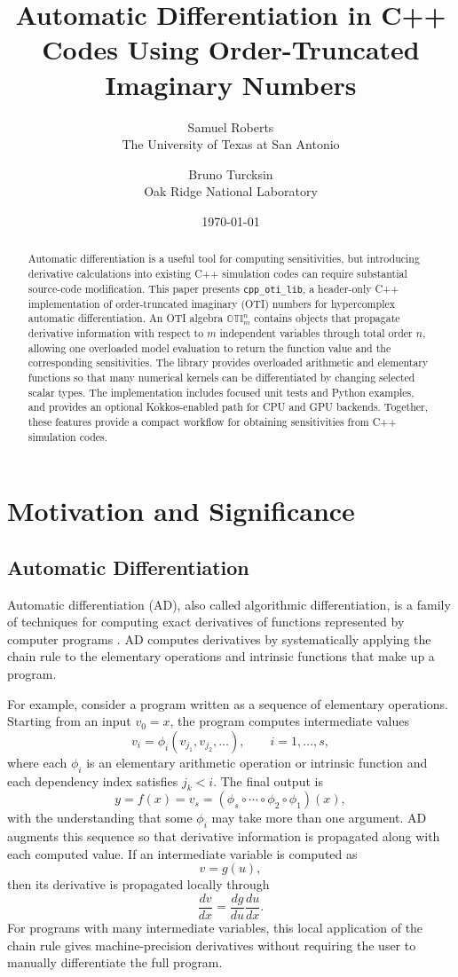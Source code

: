 \documentclass[11pt]{article}
\title{Automatic Differentiation in C++ Codes Using Order-Truncated Imaginary Numbers}
\author{
    Samuel Roberts\\
    The University of Texas at San Antonio
    \and
    Bruno Turcksin\\
    Oak Ridge National Laboratory
}
\date{\today}
\begin{document}
\maketitle

\begin{abstract}
Automatic differentiation is a useful tool for computing sensitivities, but
introducing derivative calculations into existing C++ simulation codes can
require substantial source-code modification. This paper presents
\texttt{cpp\_oti\_lib}, a header-only C++ implementation of order-truncated
imaginary (OTI) numbers for hypercomplex automatic differentiation. An OTI
algebra \(\mathbb{OTI}_m^n\) contains objects that propagate derivative
information with respect to \(m\) independent variables through total order
\(n\), allowing one overloaded model evaluation to return the function
value and the corresponding sensitivities. The library provides overloaded
arithmetic and elementary functions so that many numerical kernels can be
differentiated by changing selected scalar types. The implementation includes
focused unit tests and Python examples, and provides an optional
Kokkos-enabled path for CPU and GPU backends. Together, these features provide
a compact workflow for obtaining sensitivities from C++ simulation codes.
\end{abstract}

\tableofcontents

\section{Motivation and Significance}

\subsection{Automatic Differentiation}

Automatic differentiation (AD), also called algorithmic differentiation, is a
family of techniques for computing exact derivatives of functions represented
by computer programs \cite{Griewank2008,Baydin2015,Bucker2005}. AD computes
derivatives by systematically applying the chain rule to the elementary
operations and intrinsic functions that make up a program.

For example, consider a program written as a sequence of elementary operations.
Starting from an input \(v_0 = x\), the program computes intermediate values
\[
    v_i = \phi_i(v_{j_1}, v_{j_2}, \ldots),
    \qquad i = 1,\ldots,s,
\]
where each \(\phi_i\) is an elementary arithmetic operation or intrinsic
function and each dependency index satisfies \(j_k < i\). The final output is
\[
    y = f(x) = v_s
      = (\phi_s \circ \cdots \circ \phi_2 \circ \phi_1)(x),
\]
with the understanding that some \(\phi_i\) may take more than one argument.
AD augments this sequence so that derivative information is propagated along
with each computed value. If an intermediate variable is computed as
\[
    v = g(u),
\]
then its derivative is propagated locally through
\[
    \frac{dv}{dx} = \frac{dg}{du}\frac{du}{dx}.
\]
For programs with many intermediate variables, this local application of the
chain rule gives machine-precision derivatives without requiring the user to
manually differentiate the full program.
\end{document}
